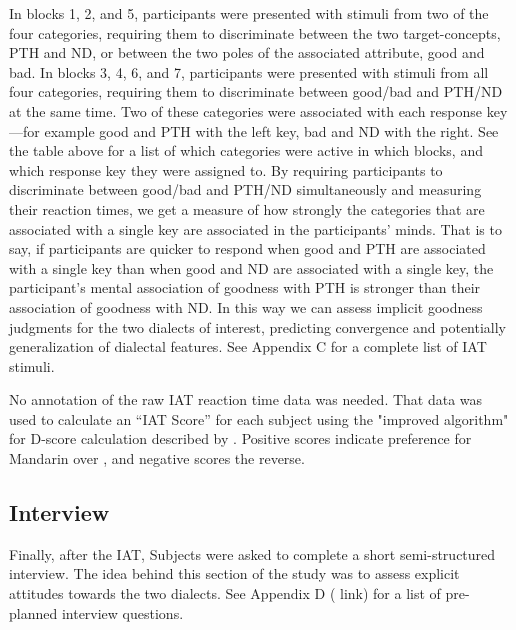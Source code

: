 In blocks 1, 2, and 5, participants were presented with stimuli from two of the four categories, requiring them to discriminate between the two target-concepts, PTH and ND, or between the two poles of the associated attribute, good and bad. In blocks 3, 4, 6, and 7, participants were presented with stimuli from all four categories, requiring them to discriminate between good/bad and PTH/ND at the same time. Two of these categories were associated with each response key---for example good and PTH with the left key, bad and ND with the right. See the table above for a list of which categories were active in which blocks, and which response key they were assigned to. By requiring participants to discriminate between good/bad and PTH/ND simultaneously and measuring their reaction times, we get a measure of how strongly the categories that are associated with a single key are associated in the participants’ minds. That is to say, if participants are quicker to respond when good and PTH are associated with a single key than when good and ND are associated with a single key, the participant’s mental association of goodness with PTH is stronger than their association of goodness with ND. In this way we can assess implicit goodness judgments for the two dialects of interest, predicting convergence and potentially generalization of dialectal features. See Appendix C for a complete list of IAT stimuli.

No annotation of the raw IAT reaction time data was needed. That data was used to calculate an “IAT Score” for each subject using the "improved algorithm" for D-score calculation described by \cite{greenwald2003understanding}. Positive scores indicate preference for Mandarin over \ND{}, and negative scores the reverse.%

\subsection{Interview}
\label{ssec:procedureInterview}
Finally, after the IAT, Subjects were asked to complete a short semi-structured interview. The idea behind this section of the study was to assess explicit attitudes towards the two dialects. See Appendix D (\xxxxx{} link) for a list of pre-planned interview questions.

